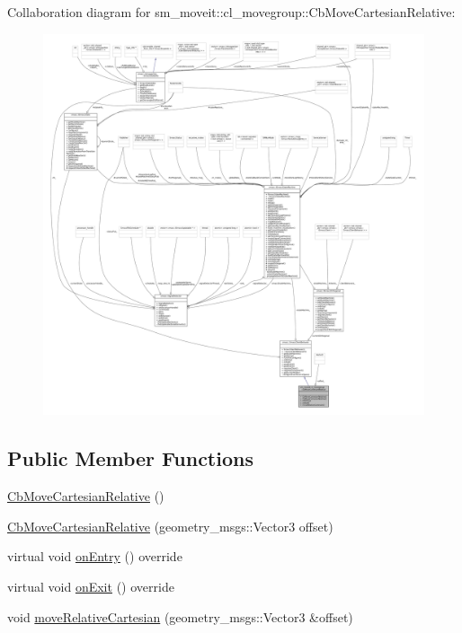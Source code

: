 Collaboration diagram for sm\+\_\+moveit\+:\+:cl\+\_\+movegroup\+:\+:Cb\+Move\+Cartesian\+Relative\+:
\nopagebreak
\begin{figure}[H]
\begin{center}
\leavevmode
\includegraphics[width=350pt]{classsm__moveit_1_1cl__movegroup_1_1CbMoveCartesianRelative__coll__graph}
\end{center}
\end{figure}
\subsection*{Public Member Functions}
\begin{DoxyCompactItemize}
\item 
\hyperlink{classsm__moveit_1_1cl__movegroup_1_1CbMoveCartesianRelative_a0f2947c4d3b9a1a3e43031e0d3d55e1f}{Cb\+Move\+Cartesian\+Relative} ()
\item 
\hyperlink{classsm__moveit_1_1cl__movegroup_1_1CbMoveCartesianRelative_a750939f120f462a0af55415007cf656a}{Cb\+Move\+Cartesian\+Relative} (geometry\+\_\+msgs\+::\+Vector3 offset)
\item 
virtual void \hyperlink{classsm__moveit_1_1cl__movegroup_1_1CbMoveCartesianRelative_a92286b179e2b55d93f0c0195a9f05039}{on\+Entry} () override
\item 
virtual void \hyperlink{classsm__moveit_1_1cl__movegroup_1_1CbMoveCartesianRelative_ace52bd9a2668c34f1046458c9d3257fa}{on\+Exit} () override
\item 
void \hyperlink{classsm__moveit_1_1cl__movegroup_1_1CbMoveCartesianRelative_a0abbcf6169889ae6788f29fade703c7b}{move\+Relative\+Cartesian} (geometry\+\_\+msgs\+::\+Vector3 \&offset)
\end{DoxyCompactItemize}
